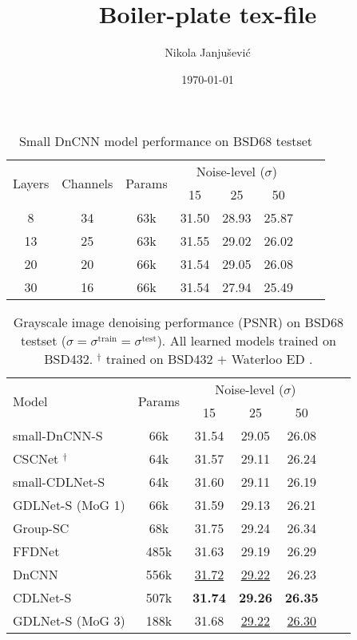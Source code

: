 \documentclass[12pt,a4paper,leqno]{amsart}
\title{Boiler-plate tex-file}
\author{Nikola Janju\v{s}evi\'{c}}
\date{\today}
\begin{document}
\begin{table}
\centering
\caption{Small DnCNN model performance on BSD68 testset}
\begin{tabular}{cccccccc} \hline
\multirow{2}{*}{Layers} & \multirow{2}{*}{Channels} & \multirow{2}{*}{Params}&\multicolumn{3}{c}{Noise-level ($\sigma$)} \\
   &    &     & 15    & 25    & 50 \\ \hline
8  & 34 & 63k & 31.50 & 28.93 & 25.87 \\
13 & 25 & 63k & 31.55 & 29.02 & 26.02 \\
20 & 20 & 66k & 31.54 & 29.05 & 26.08 \\
30 & 16 & 66k & 31.54 & 27.94 & 25.49 \\\hline
\end{tabular}
\end{table}



\begin{table}
\centering
\caption{Grayscale image denoising performance (PSNR) on BSD68 testset ($\sigma
= \sigma^{\mathrm{train}} = \sigma^{\mathrm{test}}$). All learned models
trained on BSD432\cite{bsd}. $^\dagger$ trained on BSD432 $+$ Waterloo ED
\cite{ma2017waterloo}.}
\begin{tabular}{lcccccc} \hline
\multirow{2}{*}{Model} & \multirow{2}{*}{Params} & \multicolumn{3}{c}{Noise-level ($\sigma$)} \\
 & & 15 & 25 & 50 \\ \hline
small-DnCNN-S & 66k & 31.54 & 29.05 & 26.08 \\
CSCNet \cite{Simon2019}$^\dagger$ & 64k & 31.57 & 29.11 & 26.24 \\
small-CDLNet-S \cite{janjuvsevic2021cdlnet} & 64k & 31.60 & 29.11 & 26.19 \\
GDLNet-S (MoG 1) \cite{gdlnet}  & 66k  & 31.59 & 29.13 & 26.21 \\
Group-SC \cite{mairal} & 68k & 31.75 & 29.24 & 26.34 \\ \hline
FFDNet \cite{FFDNet}    & 485k& 31.63 & 29.19 & 26.29 \\
DnCNN \cite{DnCNN}      & 556k& \underline{31.72}& \underline{29.22} & {26.23} \\
CDLNet-S \cite{janjuvsevic2021cdlnet} & 507k& \bf{31.74} & \bf{29.26} & \bf{26.35} \\
GDLNet-S (MoG 3) \cite{gdlnet}       & 188k& 31.68  & \underline{29.22}  & \underline{26.30}  \\\hline
\end{tabular}
\end{table}
\end{document}
